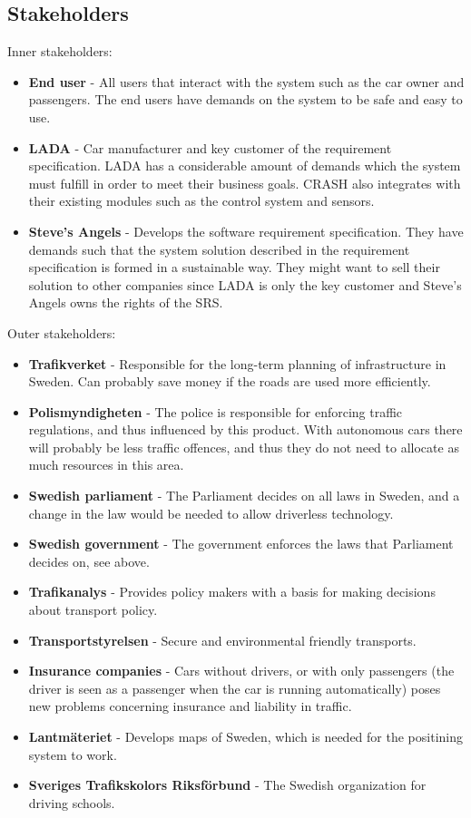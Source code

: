 \documentclass{article}
\begin{document}
\subsection{Stakeholders}
\noindent Inner stakeholders:
\begin{itemize}
\item \textbf{End user} - All users that interact with the system such as the car owner and passengers. The end users have demands on the system to be safe and easy to use.
\item \textbf{LADA} - Car manufacturer and key customer of the requirement specification. LADA has a considerable amount of demands which the system must fulfill in order to meet their business goals. CRASH also integrates with their existing modules such as the control system and sensors.
\item \textbf{Steve's Angels} - Develops the software requirement specification. They have demands such that the system solution described in the requirement specification is formed in a sustainable way. They might want to sell their solution to other companies since LADA is only the key customer and Steve's Angels owns the rights of the SRS.
\end{itemize}

\noindent Outer stakeholders:
\begin{itemize}
\item \textbf{Trafikverket} - Responsible for the long-term planning of infrastructure in Sweden. Can probably save money if the roads are used more efficiently. 
\item \textbf{Polismyndigheten} - The police is responsible for enforcing traffic regulations, and thus influenced by this product. With autonomous cars there will probably be less traffic offences, and thus they do not need to allocate as much resources in this area. 
\item \textbf{Swedish parliament} - The Parliament decides on all laws in Sweden, and a change in the law would be needed to allow driverless technology.
\item \textbf{Swedish government} - The government enforces the laws that Parliament decides on, see above.
\item \textbf{Trafikanalys} - Provides policy makers with a basis for making decisions about transport policy.
\item \textbf{Transportstyrelsen} - Secure and environmental friendly transports.
\item \textbf{Insurance companies} - Cars without drivers, or with only passengers (the driver is seen as a passenger when the car is running automatically) poses new problems concerning insurance and liability in traffic.
\item \textbf{Lantmäteriet} - Develops maps of Sweden, which is needed for the positining system to work.
\item \textbf{Sveriges Trafikskolors Riksförbund} - The Swedish organization for driving schools.
\end{itemize}
\end{document}

